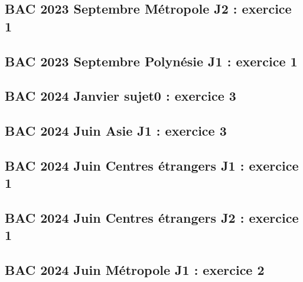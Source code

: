 \documentclass[lang=fr,edition=teacher,layout=sheet]{mxbook}
\begin{document}
\begingroup\endgroup
\par\bigskip
{}\subsection*{BAC 2023 Septembre Métropole J2 : exercice 1}
\begingroup\endgroup
\par\bigskip
{}\subsection*{BAC 2023 Septembre Polynésie J1 : exercice 1}
\begingroup\endgroup
\par\bigskip
{}\subsection*{BAC 2024 Janvier sujet0 : exercice 3}
\begingroup\endgroup
\par\bigskip
{}\subsection*{BAC 2024 Juin Asie J1 : exercice 3}
\begingroup\endgroup
\par\bigskip
{}\subsection*{BAC 2024 Juin Centres étrangers J1 : exercice 1}
\begingroup\endgroup
\par\bigskip
{}\subsection*{BAC 2024 Juin Centres étrangers J2 : exercice 1}
\begingroup\endgroup
\par\bigskip
{}\subsection*{BAC 2024 Juin Métropole J1 : exercice 2}
\end{document}
